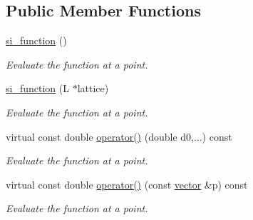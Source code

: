 \subsection*{Public Member Functions}
\begin{DoxyCompactItemize}
\item 
\mbox{\label{classsisl_1_1si__function_ae2139529aa91acee873a392fe280243d}} 
\hyperlink{classsisl_1_1si__function_ae2139529aa91acee873a392fe280243d}{si\+\_\+function} ()
\begin{DoxyCompactList}\small\item\em Evaluate the function at a point. \end{DoxyCompactList}\item 
\mbox{\label{classsisl_1_1si__function_ae96061fb7b2ac6c7937728f31278e431}} 
\hyperlink{classsisl_1_1si__function_ae96061fb7b2ac6c7937728f31278e431}{si\+\_\+function} (L $\ast$lattice)
\begin{DoxyCompactList}\small\item\em Evaluate the function at a point. \end{DoxyCompactList}\item 
\mbox{\label{classsisl_1_1si__function_a717a52b3c4affb61b276e916d2b008d3}} 
virtual const double \hyperlink{classsisl_1_1si__function_a717a52b3c4affb61b276e916d2b008d3}{operator()} (double d0,...) const
\begin{DoxyCompactList}\small\item\em Evaluate the function at a point. \end{DoxyCompactList}\item 
\mbox{\label{classsisl_1_1si__function_ac273cdbf9db96a8e35ac4d6e67fae71f}} 
virtual const double \hyperlink{classsisl_1_1si__function_ac273cdbf9db96a8e35ac4d6e67fae71f}{operator()} (const \hyperlink{namespacesisl_a2069bd5374a9be042ff3ce3306d41e1a}{vector} \&p) const
\begin{DoxyCompactList}\small\item\em Evaluate the function at a point. \end{DoxyCompactList}\item 
\mbox{\label{classsisl_1_1si__function_acb42bd4f8b06bc38708ae2ccf8ad6b93}} 

\end{DoxyCompactItemize}
